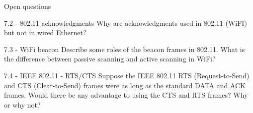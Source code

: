 \documentclass[a4paper]{article}
\begin{document}
\begin{quiz}{Open questions}
\begin{essay}[points=1]{7.2 - 802.11 acknowledgments}
Why are acknowledgments used in 802.11 (WiFI) but not in wired Ethernet?
\end{essay}

\begin{essay}[points=1]{7.3 - WiFi beacon}
Describe some roles of the beacon frames in 802.11. What is the difference between passive scanning and active scanning in WiFi? 
\end{essay}

\begin{essay}[points=1]{7.4 - IEEE 802.11 - RTS/CTS}
Suppose the IEEE 802.11 RTS (Request-to-Send) and CTS (Clear-to-Send) frames were as long as the standard DATA and ACK frames. Would there be any advantage to using the CTS and RTS frames? Why or why not? 
\end{essay}

\end{quiz}
\end{document}
